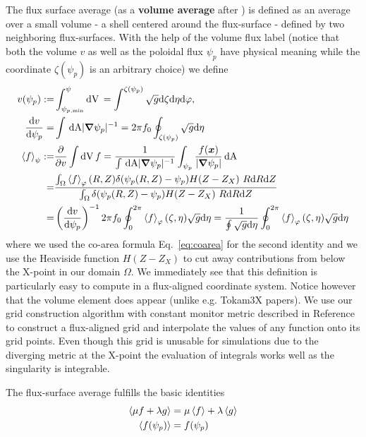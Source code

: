 The flux surface average (as a {\bf volume average} after \cite{haeseleer}) is defined as an average over a
small volume - a shell centered around the flux-surface - defined by two neighboring flux-surfaces.
With the help of the volume
flux label (notice that both the volume $v$ as well as the poloidal flux $\psi_p$ have physical
meaning while the coordinate $\zeta(\psi_p)$ is an arbitrary choice) we define
\begin{align} \label{eq:fsa_vol}
v(\psi_p) :=& \int_{\psi_{p,\min}}^\psi \mathrm{dV}\, = \int^{\zeta(\psi_p)} \sqrt{g}\mathrm{d}\zeta\mathrm{d}\eta\mathrm{d}\varphi,
\\
\frac{\mathrm{d} v}{\mathrm{d}\psi_p} =& \int\,\mathrm{dA} |{\boldsymbol{\nabla}}\psi_p|^{-1} = 2\pi f_0\oint_{\zeta(\psi_p)} \sqrt{g}\mathrm{d}\eta \\
\left \langle  f  \right \rangle_\psi :=& \frac{\partial}{\partial v} \int \mathrm{dV}\, f
 = \frac{1}{\int \,\mathrm{dA} |{\boldsymbol{\nabla}}\psi_p|^{-1} } \int_{\psi_p} \frac{f({\boldsymbol{x}})}{|{\boldsymbol{\nabla}}\psi_p|} \,\mathrm{dA} \nonumber\\
=& \frac{\int_\Omega \left \langle  f \right\rangle_\varphi(R,Z) \delta(\psi_p(R,Z)-\psi_{p})H(Z-Z_X)\ R \mathrm{d} R \mathrm{d} Z}
{\int_\Omega \delta(\psi_p(R,Z)-\psi_{p})H(Z-Z_X)\ R \mathrm{d} R \mathrm{d} Z}\nonumber\\
 =& \left(\frac{\mathrm{d} v}{\mathrm{d}\psi_p }\right)^{-1} 2\pi f_0 \oint_0^{2\pi} \left \langle  f \right\rangle_\varphi(\zeta,\eta) \sqrt{g}\mathrm{d}\eta
 = \frac{1}{\oint \sqrt{g}\mathrm{d}\eta } \oint_0^{2\pi} \left \langle  f \right\rangle_\varphi(\zeta,\eta) \sqrt{g}\mathrm{d}\eta
\end{align}
where we used the co-area formula Eq.~\eqref{eq:coarea} for the second identity
and we use the Heaviside function $H(Z-Z_X)$ to cut away contributions from below the X-point
in our domain $\Omega$.
 We immediately see that this definition is particularly easy to compute
 in a flux-aligned coordinate system. Notice however that the volume element
 does appear (unlike e.g. Tokam3X papers).
 We use our grid construction algorithm with constant monitor metric described in Reference~\cite{Wiesenberger2018} to construct a flux-aligned grid and interpolate
 the values of any function onto its grid points.
 Even though this grid is unusable for simulations due to the diverging metric at the X-point the
 evaluation of integrals works well as the singularity is integrable.

The flux-surface average fulfills the basic identities
\begin{align}
\label{eq:fsa_identities}
\left \langle  \mu f + \lambda g \right \rangle &= \mu\left \langle  f \right \rangle + \lambda \left \langle  g \right \rangle \\
\left \langle  f(\psi_p) \right \rangle &= f(\psi_p)
\end{align}

